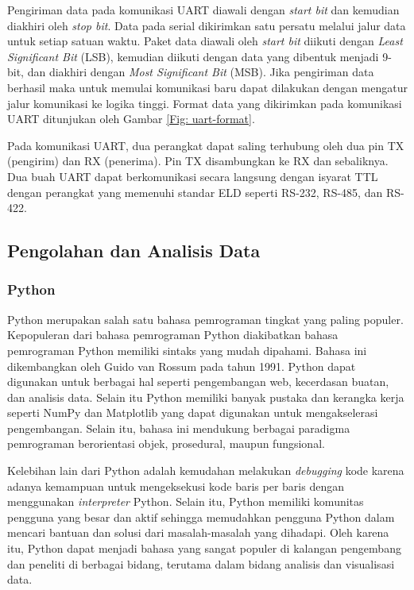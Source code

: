  Pengiriman data pada komunikasi UART diawali dengan \textit{start bit} dan kemudian diakhiri oleh \textit{stop bit}. Data pada serial dikirimkan satu persatu melalui jalur data untuk setiap satuan waktu. Paket data diawali oleh \textit{start bit} diikuti dengan \textit{Least Significant Bit} (LSB), kemudian diikuti dengan data yang dibentuk menjadi 9-bit, dan diakhiri dengan \textit{Most Significant Bit} (MSB). Jika pengiriman data berhasil maka untuk memulai komunikasi baru dapat dilakukan dengan mengatur jalur komunikasi ke logika tinggi. Format data yang dikirimkan pada komunikasi UART ditunjukan oleh Gambar \ref{Fig: uart-format}.

Pada komunikasi UART, dua perangkat dapat saling terhubung oleh dua pin TX (pengirim) dan RX (penerima). Pin TX disambungkan ke RX dan sebaliknya. Dua buah UART dapat berkomunikasi secara langsung dengan isyarat TTL dengan perangkat yang memenuhi standar ELD seperti RS-232, RS-485, dan RS-422.

\subsection{Pengolahan dan Analisis Data}

\subsubsection{Python}
Python merupakan salah satu bahasa pemrograman tingkat yang paling populer. Kepopuleran dari bahasa pemrograman Python diakibatkan bahasa pemrograman Python memiliki sintaks yang mudah dipahami. Bahasa ini dikembangkan oleh Guido van Rossum pada tahun 1991. Python dapat digunakan untuk berbagai hal seperti pengembangan web, kecerdasan buatan, dan analisis data. Selain itu Python memiliki banyak pustaka dan kerangka kerja seperti NumPy dan Matplotlib yang dapat digunakan untuk mengakselerasi pengembangan. Selain itu, bahasa ini mendukung berbagai paradigma pemrograman berorientasi objek, prosedural, maupun fungsional.

Kelebihan lain dari Python adalah kemudahan melakukan \textit{debugging} kode karena adanya kemampuan untuk mengeksekusi kode baris per baris dengan menggunakan \textit{interpreter} Python. Selain itu, Python memiliki komunitas pengguna yang besar dan aktif sehingga memudahkan pengguna Python dalam mencari bantuan dan solusi dari masalah-masalah yang dihadapi. Oleh karena itu, Python dapat menjadi bahasa yang sangat populer di kalangan pengembang dan peneliti di berbagai bidang, terutama dalam bidang analisis dan visualisasi data.

